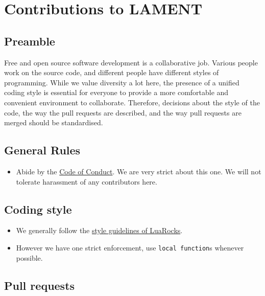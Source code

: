 \section{Contributions to LAMENT}\label{contributions-to-lament}

\subsection{Preamble}\label{preamble}

Free and open source software development is a collaborative job.
Various people work on the source code, and different people have
different styles of programming. While we value diversity a lot here,
the presence of a unified coding style is essential for everyone to
provide a more comfortable and convenient environment to collaborate.
Therefore, decisions about the style of the code, the way the pull
requests are described, and the way pull requests are merged should be
standardised.

\subsection{General Rules}\label{general-rules}

\begin{itemize}
\tightlist
\item
  Abide by the \href{CODE_OF_CONDUCT.md}{Code of Conduct}. We are very
  strict about this one. We will not tolerate harassment of any
  contributors here.
\end{itemize}

\subsection{Coding style}\label{coding-style}

\begin{itemize}
\tightlist
\item
  We generally follow the
  \href{https://github.com/luarocks/lua-style-guide}{style guidelines of
  LuaRocks}.
\item
  However we have one strict enforcement, use \texttt{local\ function}s
  whenever possible.
\end{itemize}

\subsection{Pull requests}\label{pull-requests}

